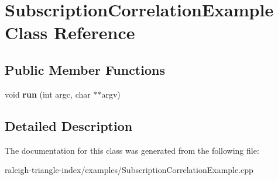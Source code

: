 \section{Subscription\+Correlation\+Example Class Reference}
\label{class_subscription_correlation_example}
\subsection*{Public Member Functions}
\begin{DoxyCompactItemize}
\item 
void {\bfseries run} (int argc, char $\ast$$\ast$argv)\label{class_subscription_correlation_example_a3ad0b2a4899eb5e6c16cc6fc12511ef7}

\end{DoxyCompactItemize}


\subsection{Detailed Description}


The documentation for this class was generated from the following file\+:\begin{DoxyCompactItemize}
\item 
raleigh-\/triangle-\/index/examples/Subscription\+Correlation\+Example.\+cpp\end{DoxyCompactItemize}
